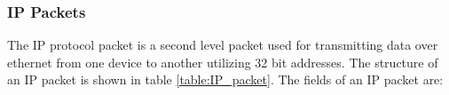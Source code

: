 
\subsubsection{IP Packets}
The IP protocol packet is a second level packet used for transmitting data over ethernet from one device to another utilizing 32 bit addresses. The structure of an IP packet is shown in table \ref{table:IP_packet}. The fields of an IP packet are:

